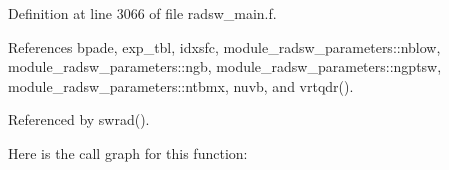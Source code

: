 Definition at line 3066 of file radsw\+\_\+main.\+f.



References bpade, exp\+\_\+tbl, idxsfc, module\+\_\+radsw\+\_\+parameters\+::nblow, module\+\_\+radsw\+\_\+parameters\+::ngb, module\+\_\+radsw\+\_\+parameters\+::ngptsw, module\+\_\+radsw\+\_\+parameters\+::ntbmx, nuvb, and vrtqdr().



Referenced by swrad().

Here is the call graph for this function\+:
\mbox{\label{group__module__radsw__main_ga784397878835a8cdd0b14a7b9eafb4e3}} 
